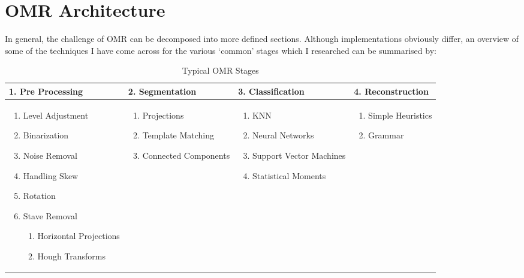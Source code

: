 \section{OMR Architecture}

In general, the challenge of OMR can be decomposed into more defined sections. Although implementations obviously differ, an overview of some of the techniques I have come across for the various `common' stages which I researched can be summarised by:

\begin{table}[h]
\footnotesize
\begin{tabularx}{\linewidth}{ X X X X }
\toprule
  \textbf{1. Pre Processing} & \textbf{2. Segmentation} & \textbf{3. Classification} &  \textbf{4. Reconstruction} \\
  \midrule

  \begin{enumerate}[leftmargin=*]
    \item Level Adjustment
    \item Binarization
    \item Noise Removal
    \item Handling Skew
    \item Rotation
    \item Stave Removal
      \begin{enumerate}
        \item Horizontal Projections
        \item Hough Transforms
      \end{enumerate}
  \end{enumerate}

  &

  \begin{enumerate}[leftmargin=*]
    \item Projections
    \item Template Matching
    \item Connected Components
  \end{enumerate}
  
  &

  \begin{enumerate}[leftmargin=*]
    \item \acrfull{KNN}
    \item Neural Networks
    \item Support Vector Machines
    \item Statistical Moments
  \end{enumerate}

  &

  \begin{enumerate}[leftmargin=*]
    \item Simple Heuristics
    \item Grammar
  \end{enumerate} \\
  \bottomrule
\end{tabularx}
\caption{Typical OMR Stages}
\end{table}

